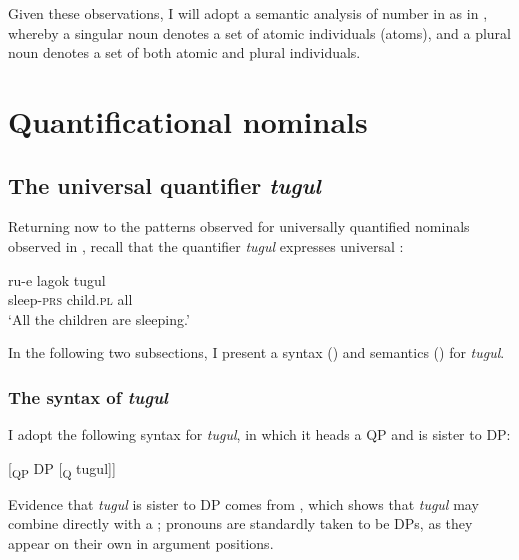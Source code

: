 \documentclass[output=paper,newtxmath,modfonts,nonflat,hidelinks]{langsci/langscibook}
\begin{document}
\z

Given these observations, I will adopt a semantic analysis of number in  as in \citealt{Link:1983}, whereby a singular noun denotes a set of atomic individuals (atoms), and a plural noun denotes a set of both atomic and plural individuals.

\section{Quantificational nominals}
\label{sec:landman:qnominals}

\subsection{The universal quantifier \textit{tugul}}
Returning now to the patterns observed for universally quantified nominals observed in , recall that the quantifier \textit{tugul} expresses universal : 

\begin{exe}
     \gll ru-e lagok tugul \\
          sleep-\textsc{prs} child.\textsc{pl} all\\ 
     \glt ‘All the children are sleeping.’
\end{exe}

 In the following two subsections, I present a syntax () and semantics () for \textit{tugul}.

\subsubsection{The syntax of \textit{tugul}}
\label{sec:landman:tugulsyn}
\noindent I adopt the following syntax for \textit{tugul}, in which it heads a QP and is sister to DP:  

\ea \label{ex:landman:tugultree}
[\textsubscript{QP} DP [\textsubscript{Q} tugul]]  %
\z

 Evidence that \textit{tugul} is sister to DP comes from , which shows that \textit{tugul} may combine directly with a ; pronouns are standardly taken to be DPs, as they appear on their own in argument positions.
\end{document}

